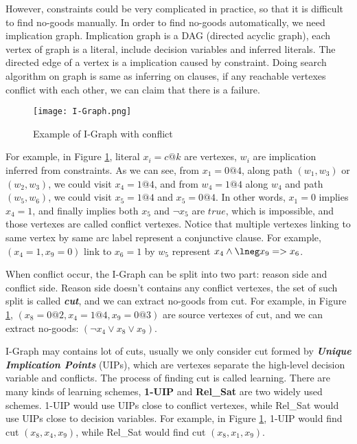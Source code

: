 \documentclass{article}
\begin{document}
However, constraints could be very complicated in practice, so that it is difficult to find no-goods manually. In order to find no-goods automatically, we need implication graph. Implication graph is a DAG (directed acyclic graph), each vertex of graph is a literal, include decision variables and inferred literals.  The directed edge of a vertex is a implication caused by constraint. Doing search algorithm on graph is same as inferring on clauses, if any reachable vertexes conflict with each other, we can claim that there is a failure.

\begin{figure}
    \centering
    \texttt{[image: I-Graph.png]}
    \caption{Example of I-Graph with conflict\cite{tichy2006clause}}
    \label{fig:igraph}
\end{figure}

For example, in Figure \ref{fig:igraph}, literal $x_i=c@k$ are vertexes,  $w_i$ are implication inferred from constraints. As we can see, from $x_1=0@4$, along path $(w_1, w_3)$ or $(w_2, w_3)$, we could visit $x_4=1@4$, and from $w_4=1@4$ along $w_4$ and path $(w_5, w_6)$, we could visit $x_5=1@4$ and $x_5=0@4$. In other words, $x_1=0$ implies $x_4=1$, and finally implies both $x_5$ and $\lnot x_5$ are $true$, which is impossible, and those vertexes are called conflict vertexes. Notice that multiple vertexes linking to same vertex by same arc label represent a conjunctive clause. For example, $(x_4=1, x_9=0)$ link to $x_6=1$ by $w_5$ represent $ x_4 \land \lneg x_9 => x_6$.


When conflict occur, the I-Graph can be split into two part: reason side and conflict side. Reason side doesn't contains any conflict vertexes, the  set of such split is called \textbf{\textit{cut}}, and we can extract no-goods from cut. For example, in Figure \ref{fig:igraph}, $(x_8=0@2, x_4=1@4, x_9=0@3)$ are source vertexes of cut, and we can extract no-goods: $(\lnot x_4 \lor x_8 \lor x_9)$.

I-Graph may contains lot of cuts, usually we only consider cut formed by \textbf{\textit{Unique Implication Points}} (UIPs), which are vertexes separate the high-level decision variable and conflicts. The process of finding cut is called learning. There are many kinds of learning schemes, \textbf{1-UIP} and \textbf{Rel\_Sat} are two widely used schemes. 1-UIP would use UIPs close to conflict vertexes, while Rel\_Sat would use UIPs close to decision variables. For example, in Figure \ref{fig:igraph}, 1-UIP would find cut $(x_8, x_4, x_9)$, while Rel\_Sat would find cut $(x_8, x_1, x_9)$.
\end{document}

